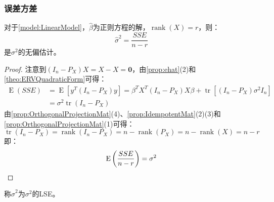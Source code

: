 \subsubsection{误差方差}
\begin{theorem}\label{theo:VarianceOfErrorTerm}
	对于\cref{model:LinearModel}，$\hat{\beta}$为正则方程的解，$\operatorname{rank}(X)=r$，则：
	\begin{equation*}
		\hat{\sigma}^2=\frac{SSE}{n-r}
	\end{equation*}
	是$\sigma^2$的无偏估计。
\end{theorem}
\begin{proof}
	注意到$(I_n-P_X)X=X-X=\mathbf{0}$，由\cref{prop:ehat}(2)和\cref{theo:ERVQuadraticForm}可得：
	\begin{align*}
		\operatorname{E}(SSE)&=\operatorname{E}[y^T(I_n-P_X)y] =\beta^TX^T(I_n-P_X)X\beta+\operatorname{tr}[(I_n-P_X)\sigma^2I_n] \\
		&=\sigma^2\operatorname{tr}(I_n-P_X)
	\end{align*}
	由\cref{prop:OrthogonalProjectionMat}(4)、\cref{prop:IdempotentMat}(2)(3)和\cref{prop:OrthogonalProjectionMat}(1)可得：
	\begin{equation*}
		\operatorname{tr}(I_n-P_X)=\operatorname{rank}(I_n-P_X)=n-\operatorname{rank}(P_X)=n-\operatorname{rank}(X)=n-r
	\end{equation*}
	即：
	\begin{equation*}
		\operatorname{E}\left(\frac{SSE}{n-r}\right)=\sigma^2\qedhere
	\end{equation*}
\end{proof}
\begin{definition}
	称$\hat{\sigma}^2$为$\sigma^2$的LSE。
\end{definition}

